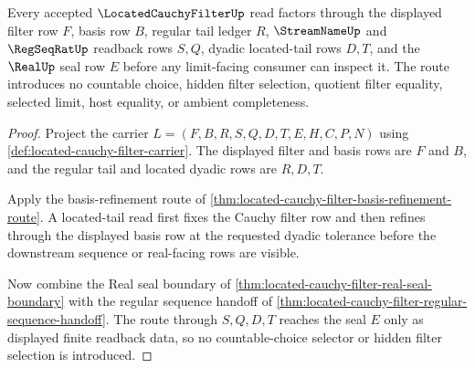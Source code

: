 \begin{theorem}
\label{thm:located-cauchy-filter-choice-free-basis}
Every accepted $\LocatedCauchyFilterUp$ read factors through the displayed filter row $F$, basis row $B$, regular tail ledger $R$, $\StreamNameUp$ and $\RegSeqRatUp$ readback rows $S,Q$, dyadic located-tail rows $D,T$, and the $\RealUp$ seal row $E$ before any limit-facing consumer can inspect it. The route introduces no countable choice, hidden filter selection, quotient filter equality, selected limit, host equality, or ambient completeness.
\end{theorem}
\begin{proof}
Project the carrier $L=(F,B,R,S,Q,D,T,E,H,C,P,N)$ using \autoref{def:located-cauchy-filter-carrier}. The displayed filter and basis rows are $F$ and $B$, and the regular tail and located dyadic rows are $R,D,T$.

Apply the basis-refinement route of \autoref{thm:located-cauchy-filter-basis-refinement-route}. A located-tail read first fixes the Cauchy filter row and then refines through the displayed basis row at the requested dyadic tolerance before the downstream sequence or real-facing rows are visible.

Now combine the Real seal boundary of \autoref{thm:located-cauchy-filter-real-seal-boundary} with the regular sequence handoff of \autoref{thm:located-cauchy-filter-regular-sequence-handoff}. The route through $S,Q,D,T$ reaches the seal $E$ only as displayed finite readback data, so no countable-choice selector or hidden filter selection is introduced.
\end{proof}


